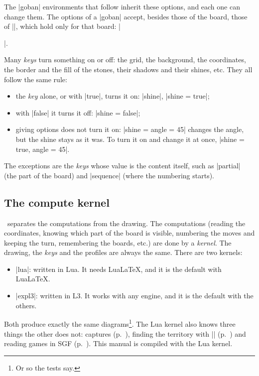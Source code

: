The |goban| environments that follow inherit these options, and each one can change them. The options of a |goban| accept, besides those of the board, those of |\pgfgoset|, which hold only for that board: |\begin{goban}[9, stone = {radius = 4pt}, mark = {line = {color = red}}]|.

\label{subsec:prender}Many \emph{keys} turn something on or off: the grid, the background, the coordinates, the border and the fill of the stones, their shadows and their shines, etc. They all follow the same rule:
\begin{itemize}
	\item the \emph{key} alone, or with |true|, turns it on: |shine|, |shine = true|;
	\item with |false| it turns it off: |shine = false|;
	\item giving options does not turn it on: |shine = {angle = 45}| changes the angle, but the shine stays as it was. To turn it on and change it at once, |shine = {true, angle = 45}|.
\end{itemize}
The exceptions are the \emph{keys} whose value is the content itself, such as |partial| (the part of the board) and |sequence| (where the numbering starts).
\subsection{The compute kernel}
\label{subsec:kernel}

\pgfgoname\ separates the computations from the drawing. The computations (reading the coordinates, knowing which part of the board is visible, numbering the moves and keeping the turn, remembering the boards, etc.) are done by a \emph{kernel}. The drawing, the \emph{keys} and the profiles are always the same. There are two kernels:
\begin{itemize}
	\item |lua|: written in Lua. It needs Lua\LaTeX, and it is the default with Lua\LaTeX.
	\item |expl3|: written in L3. It works with any engine, and it is the default with the others.
\end{itemize}

Both produce exactly the same diagrams\footnote{Or so the tests say.}. The Lua kernel also knows three things the other does not: captures (p.~\pageref{subsec:capturas}), finding the territory with || (p.~\pageref{subsec:territorio}) and reading games in SGF (p.~\pageref{subsec:sgf}). This manual is compiled with the Lua kernel.


\end{goban}

